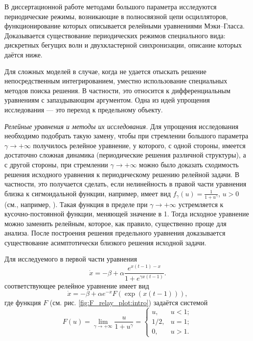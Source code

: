 В диссертационной работе методами большого параметра исследуются периодические режимы, возникающие в полносвязной цепи осцилляторов, функционирование которых описывается релейными уравнениями Мэки--Гласса. Доказывается существование периодических режимов специального вида: дискретных бегущих волн и двухкластерной синхронизации, описание которых даётся ниже.

{\methods} Для сложных моделей в случае, когда не удается отыскать решение непосредственным интегрированием, уместно использование специальных методов поиска решения. В частности, это относится к дифференциальным уравнениям с запаздывающим аргументом. Одна из идей упрощения исследования --- это переход к предельному объекту.

\textit{Релейные уравнения и методы их исследования.} Для упрощения исследования необходимо подобрать такую замену, чтобы при стремлении большого параметра $\gamma \to +\infty$ получилось релейное уравнение, у которого, с одной стороны, имеется достаточно сложная динамика (периодические решения различной структуры), а с другой стороны, при стремлении $\gamma \to +\infty$ можно было доказать сходимость решения исходного уравнения к периодическому решению релейной задачи. В частности, это получается сделать, если нелинейность в правой части уравнения близка к сигмоидальной функции, например, имеет вид $f_\gamma(u)=\frac{1}{1 + u^\gamma}$, $u > 0$ (см., например, \cite{Preobrazhenskaya2020, Glyzin2017, Krisztin2020, Bartha2021}). Такая функция в пределе при $\gamma\to+\infty$ устремляется к кусочно-постоянной функции, меняющей значение в 1. Тогда исходное уравнение можно заменить релейным, которое, как правило, существенно проще для анализа. После построения решения предельного уравнения доказывается существование асимптотически близкого решения исходной задачи.

Для исследуемого в первой части уравнения
\begin{equation}
\label{eq:intro:MG_norm1}
	\dot{x}=-\beta+\alpha\frac{e^{x(t-1)-x}}{1+e^{\gamma x(t-1)}}.
\end{equation}
соответствующее релейное уравнение имеет вид
\[
\dot{x}=-\beta + \alpha e^{-x} F(\exp({x(t-1)})),
\]
где функция $F$ (см. рис. \ref{fig:F_relay_plot:intro}) задаётся системой
\begin{equation}
	\label{eq:intro:F_relay}
	F(u)=\lim\limits_{\gamma\to +\infty}\frac{u}{1+u^{\gamma}} = 
	\begin{cases}
		u, & u < 1;\\
		1/2, & u = 1;\\
		0, & u > 1.
	\end{cases}
\end{equation}

